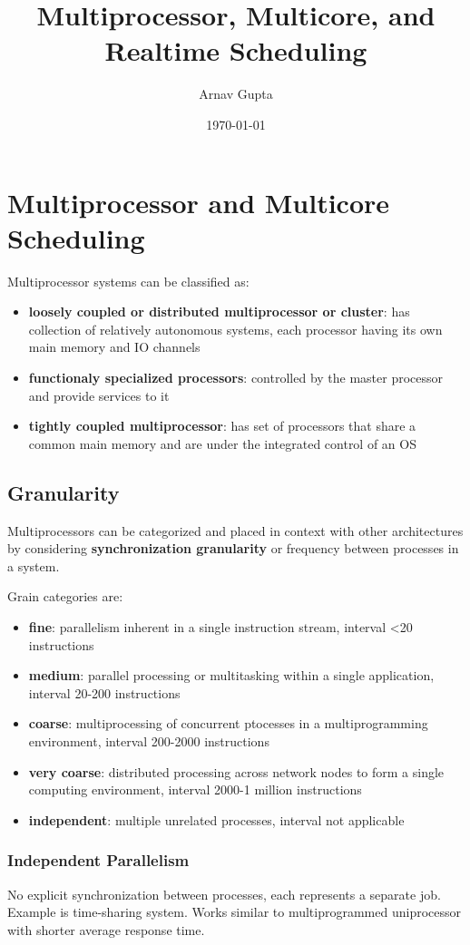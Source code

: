 \documentclass[11pt]{article}
\author{Arnav Gupta}
\date{\today}
\title{Multiprocessor, Multicore, and Realtime Scheduling}
\begin{document}
\maketitle
\tableofcontents

\section{Multiprocessor and Multicore Scheduling}
\label{sec:org69940b3}
Multiprocessor systems can be classified as:
\begin{itemize}
\item \textbf{loosely coupled or distributed multiprocessor or cluster}: has collection of relatively
autonomous systems, each processor having its own main memory and IO channels
\item \textbf{functionaly specialized processors}: controlled by the master processor and provide services
to it
\item \textbf{tightly coupled multiprocessor}: has set of processors that share a common main memory and
are under the integrated control of an OS
\end{itemize}
\subsection{Granularity}
\label{sec:org0b3463b}
Multiprocessors can be categorized and placed in context with other architectures by
considering \textbf{synchronization granularity} or frequency between processes in a system.

Grain categories are:
\begin{itemize}
\item \textbf{fine}: parallelism inherent in a single instruction stream, interval <20 instructions
\item \textbf{medium}: parallel processing or multitasking within a single application, interval
20-200 instructions
\item \textbf{coarse}: multiprocessing of concurrent ptocesses in a multiprogramming environment,
interval 200-2000 instructions
\item \textbf{very coarse}: distributed processing across network nodes to form a single computing
environment, interval 2000-1 million instructions
\item \textbf{independent}: multiple unrelated processes, interval not applicable
\end{itemize}
\subsubsection{Independent Parallelism}
\label{sec:org797242c}
No explicit synchronization between processes, each represents a separate job.
Example is time-sharing system.
Works similar to multiprogrammed uniprocessor with shorter average response time.
\end{document}
